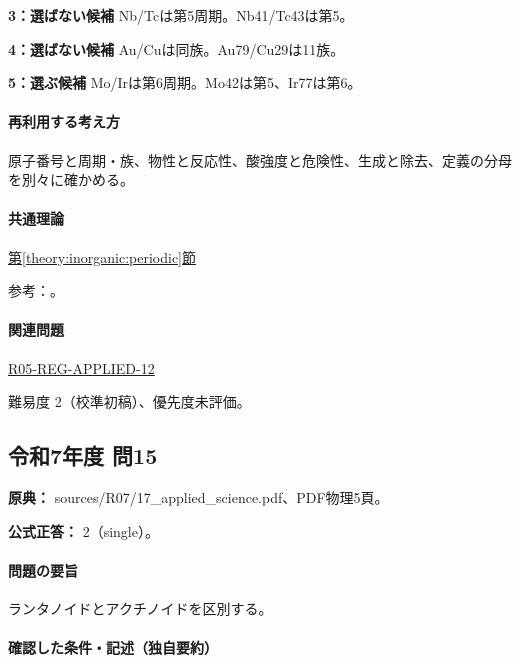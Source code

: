 \noindent\textbf{3：選ばない候補} Nb/Tcは第5周期。Nb41/Tc43は第5。\par

\noindent\textbf{4：選ばない候補} Au/Cuは同族。Au79/Cu29は11族。\par

\noindent\textbf{5：選ぶ候補} Mo/Irは第6周期。Mo42は第5、Ir77は第6。\par

\paragraph{再利用する考え方} 原子番号と周期・族、物性と反応性、酸強度と危険性、生成と除去、定義の分母を別々に確かめる。

\paragraph{共通理論} \hyperref[theory:inorganic:periodic]{第\ref*{theory:inorganic:periodic}節}

\par 参考：\cite{atomic_nist2019}。

\paragraph{関連問題} \hyperref[q:r05-reg-applied-12]{R05-REG-APPLIED-12}

\par 難易度 2（校準初稿）、優先度未評価。

\subsection{令和7年度 問15}
\label{q:r07-reg-applied-15}

\noindent\textbf{原典：} sources/R07/17\_applied\_science.pdf、PDF物理5頁。

\textbf{公式正答：} 2（single）。

\paragraph{問題の要旨} ランタノイドとアクチノイドを区別する。

\paragraph{確認した条件・記述（独自要約）}\mbox{}\par

